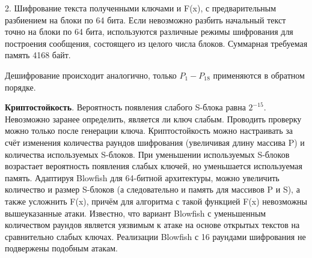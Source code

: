 2. Шифрование текста полученными ключами и F(x), с предварительным разбиением на блоки по 64 бита. Если невозможно разбить начальный текст точно на блоки по 64 бита, используются различные режимы шифрования для построения сообщения, состоящего из целого числа блоков. Суммарная требуемая память 4168 байт.

Дешифрование происходит аналогично, только  $ P_{1}-P_{18}  $ применяются в обратном порядке. 

\textbf{Криптостойкость}. Вероятность появления слабого S-блока равна   $ 2^{-15} $. Невозможно заранее определить, является ли ключ слабым. Проводить проверку можно только после генерации ключа.  Криптостойкость можно настраивать за счёт изменения количества раундов шифрования (увеличивая длину массива P) и количества используемых S-блоков. При уменьшении используемых S-блоков возрастает вероятность появления слабых ключей, но уменьшается используемая память. Адаптируя Blowfish для 64-битной архитектуры, можно увеличить количество и размер S-блоков (а следовательно и память для массивов P и S), а также усложнить F(x), причём для алгоритма с такой функцией F(x) невозможны вышеуказанные атаки. Известно, что вариант Blowfish с уменьшенным количеством раундов является уязвимым к атаке на основе открытых текстов на сравнительно слабых ключах. Реализации Blowfish с 16 раундами шифрования не подвержены подобным атакам.
\newpage